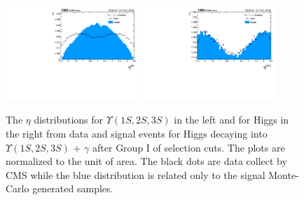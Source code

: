 \begin{figure}[!htbp]
\begin{center}
\includegraphics[width=0.45\textwidth]{figures_and_tables/outputPlots/HtoUpsilon_Cat0_ZZZZZ/au/data_x_mc/noKinCuts/h_noKin_Upsilon_eta}\hspace*{1.cm}
\includegraphics[width=0.45\textwidth]{figures_and_tables/outputPlots/HtoUpsilon_Cat0_ZZZZZ/au/data_x_mc/noKinCuts/h_noKin_Z_eta}
\end{center}\vspace*{-.5cm}
\caption{The $\eta$ distributions for $\Upsilon(1S,2S,3S)$ in the left and for Higgs in the right from data and signal events for Higgs decaying into $\Upsilon(1S,2S,3S)$ + $\gamma$ after Group I of selection cuts. The plots are normalized to the unit of area. The black dots are data collect by CMS while the blue distribution is related only to the signal Monte-Carlo generated samples.}
\label{fig:etaUpsilon_and_Higgs_HtoUpsilon_Cat0}
\end{figure}

